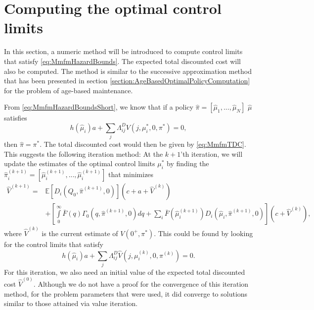 \section{Computing the optimal control limits}
In this section, a numeric method will be introduced to compute control limits that satisfy \eqref{eq:MmfmHazardBounds}.
The expected total discounted cost will also be computed.
The method is similar to the successive approximation method that has been presented in section \ref{section:AgeBasedOptimalPolicyComputation} for the problem of age-based maintenance.

From \eqref{eq:MmfmHazardBoundsShort}, we know that if a policy $\hat\pi=[\hat\mu_1,...,\hat\mu_N]$ $\hat{\mu}$ satisfies
\[
h(\hat\mu_i)a+\sum\limits_j\Lambda^D_{ij}V(j,\mu_i^*,0,\pi^*)=0,\]
then $\hat{\pi}=\pi^*$.
The total discounted cost would then be given by \eqref{eq:MmfmTDC}.
This suggests the following iteration method:
At the $k+1$'th iteration, we will update the estimates of the optimal control limits $\mu_i^*$ by finding the $\hat{\pi}_i^{(k+1)}=[\hat{\mu}_i^{(k+1)},...,\hat{\mu}_i^{(k+1)}]$ that minimizes
\[
\begin{split}
\hat{V}^{(k+1)}=&\mathbb{E}[D_{i}(Q_0,\hat\pi^{(k+1)},0)](c+a+\hat{V}^{(k)})\\
&+\left[\int\limits_0^\infty \bar{F}(q)\Gamma_0(q,\hat\pi^{(k+1)},0)dq+\sum\limits_i\bar{F}(\hat\mu_i^{(k+1)})D_{i}(\hat\mu_i,\hat\pi^{(k+1)},0)\right](c+\hat{V}^{(k)}),
\end{split}
\]
where $\hat{V}^{(k)}$ is the current estimate of $V(0^+,\pi^*)$.
This could be found by looking for the control limits that satisfy
\begin{equation}
h(\hat\mu_i)a+\sum\limits_j\Lambda^D_{ij}\hat V(j,\mu_i^{(k)},0,\pi^{(k)})=0.
\end{equation}
For this iteration, we also need an initial value of the expected total discounted cost $\hat{V}^{(0)}$.
Although we do not have a proof for the convergence of this iteration method, for the problem parameters that were used, it did converge to solutions similar to those attained via value iteration.